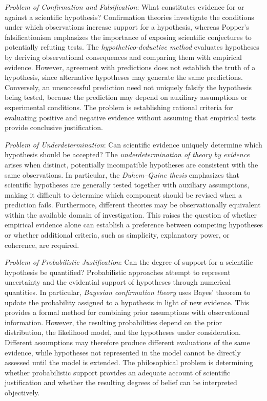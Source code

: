 \emph{Problem of Confirmation and Falsification}: What constitutes evidence for or against a scientific hypothesis? Confirmation theories investigate the conditions under which observations increase support for a hypothesis, whereas Popper's falsificationism emphasizes the importance of exposing scientific conjectures to potentially refuting tests. The \emph{hypothetico-deductive method} evaluates hypotheses by deriving observational consequences and comparing them with empirical evidence. However, agreement with predictions does not establish the truth of a hypothesis, since alternative hypotheses may generate the same predictions. Conversely, an unsuccessful prediction need not uniquely falsify the hypothesis being tested, because the prediction may depend on auxiliary assumptions or experimental conditions. The problem is establishing rational criteria for evaluating positive and negative evidence without assuming that empirical tests provide conclusive justification.

\emph{Problem of Underdetermination}: Can scientific evidence uniquely determine which hypothesis should be accepted? The \emph{underdetermination of theory by evidence} arises when distinct, potentially incompatible hypotheses are consistent with the same observations. In particular, the \emph{Duhem--Quine thesis} emphasizes that scientific hypotheses are generally tested together with auxiliary assumptions, making it difficult to determine which component should be revised when a prediction fails. Furthermore, different theories may be observationally equivalent within the available domain of investigation. This raises the question of whether empirical evidence alone can establish a preference between competing hypotheses or whether additional criteria, such as simplicity, explanatory power, or coherence, are required.

\emph{Problem of Probabilistic Justification}: Can the degree of support for a scientific hypothesis be quantified? Probabilistic approaches attempt to represent uncertainty and the evidential support of hypotheses through numerical quantities. In particular, \emph{Bayesian confirmation theory} uses Bayes' theorem to update the probability assigned to a hypothesis in light of new evidence. This provides a formal method for combining prior assumptions with observational information. However, the resulting probabilities depend on the prior distribution, the likelihood model, and the hypotheses under consideration. Different assumptions may therefore produce different evaluations of the same evidence, while hypotheses not represented in the model cannot be directly assessed until the model is extended. The philosophical problem is determining whether probabilistic support provides an adequate account of scientific justification and whether the resulting degrees of belief can be interpreted objectively.

